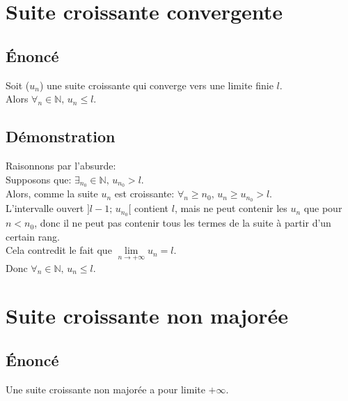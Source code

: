 \documentclass[12px]{article}
\begin{document}
	\begin{center}
	\end{center}
	
	\section{Suite croissante convergente}
	
	\subsection{\'Enoncé}
	Soit ($u_n$) une suite croissante qui converge vers une limite finie $l$.\\
	Alors $\forall_n\in\mathbb{N}, \,u_n\leq l$.
	
	\subsection{Démonstration}
	Raisonnons par l'absurde:\\
	Supposons que: $\exists_{n_0}\in\mathbb{N}, \,u_{n_0}>l$.\\
	Alors, comme la suite $u_n$ est croissante: $\forall_n\geq n_{0}, \,u_n\geq u_{n_0}>l$.\\
	L'intervalle ouvert $]l-1; \,u_{n_{0}}[$ contient $l$, mais ne peut contenir les $u_n$ que pour $n<n_0$, donc il ne peut pas contenir tous les termes de la suite à partir d'un certain rang.\\
	Cela contredit le fait que $\lim\limits_{n\rightarrow +\infty}u_n =l$.\\
	Donc $\forall_n\in\mathbb{N}, \,u_n\leq l$.
	
	\section{Suite croissante non majorée}
	
	\subsection{\'Enoncé}
	Une suite croissante non majorée a pour limite $+\infty$.
	
\end{document}
